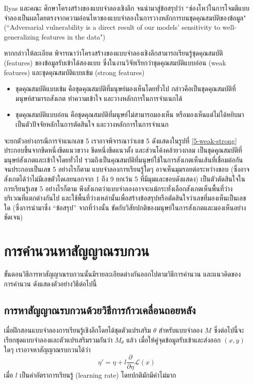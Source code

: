 \documentclass{cpereport}
\begin{document}
Ilyas และคณะ \cite{1905.02175} ศึกษาโครงสร้างของแบบจำลองเชิงลึก จนนำมาสู่ข้อสรุปว่า ``ช่องโหว่ในการโจมตีแบบจำลองเป็นผลโดยตรงจากความอ่อนไหวของแบบจำลองในการวางหลักการบนชุดคุณสมบัติของข้อมูล" (``Adversarial vulnerability is a direct result of our models’ sensitivity to well-generalizing features in the data")

หากกล่าวให้ละเอียด พิจารณาว่าโครงสร้างของแบบจำลองเชิงลึกสามารถเรียนรู้ชุดคุณสมบัติ (features) ของข้อมูลรับเข้าได้สองแบบ ซึ่งในงานวิจัยเรียกว่าชุดคุณสมบัติแบบอ่อน (weak features) และชุดคุณสมบัติแบบเข้ม (strong features)

\begin{itemize}
    \item ชุดคุณสมบัติแบบเข้ม คือชุดคุณสมบัติที่มนุษย์มองเห็นโดยทั่วไป กล่าวคือเป็นชุดคุณสมบัติที่มนุษย์สามารถสังเกต ทำความเข้าใจ และวางหลักการในการจำแนกได้
    \item ชุดคุณสมบัติแบบอ่อน คือชุดคุณสมบัติที่มนุษย์ไม่สามารถมองเห็น หรือมองเห็นแต่ไม่ได้หยิบมาเป็นตัวปัจจัยหลักในการตัดสินใจ และวางหลักการในการจำแนก
\end{itemize}

จะยกตัวอย่างกรณีการจำแนกเลข 5 เราอาจพิจารณาว่าเลข 5 ดังแสดงในรูปที่ \ref{5-weak-strong} ประกอบขึ้นจากขีดหนึ่งขีดแนวขวาง ขีดหนึ่งขีดแนวตั้ง และส่วนโค้งคล้ายวงกลม เป็นชุดคุุณสมบัติที่มนุษย์สังเกตและเข้าใจโดยทั่วไป รวมถึงเป็นคุณสมบัติที่มนุษย์ใช้ในการสังเกตเห็นเส้นที่เชื่อมต่อกันจนประกอบเป็นเลข 5 อย่างไรก็ตาม แบบจำลองการเรียนรู้ใดๆ อาจเห็นมุมรอยต่อระหว่างขอบ (ซึ่งอาจสังเกตได้ว่าไม่มีเลขตัวใดเลยนอกจาก 1 ถึง 9 ยกเว้น 5 ที่มีมุมและขอบดังแสดง) เป็นตัวตัดสินใจในการเรียนรู้เลข 5 อย่างไรก็ตาม พึงสังเกตว่าแบบจำลองอาจจะแม้กระทั่งเลือกสังเกตเห็นพื้นที่ว่างบริเวณที่แตกต่างกันไป และใช้พื้นที่ว่างเหล่านั้นเพื่อสร้างข้อสรุปหรือตัดสินใจว่าเลขที่มองเห็นเป็นเลขใด (ซึ่งการนำมาซึ่ง ``ข้อสรุป'' จากที่ว่างนั้น ขัดกับวิสัยปกติของมนุษย์ในการสังเกตและมองเห็นอย่างชัดเจน)

\section{การคำนวนหาสัญญาณรบกวน}

ขั้นตอนวิธีการหาสัญญาณรบกวนนั้นมีรายละเอียดต่างกันออกไปตามวิธีการคำนวน และแนวคิดของการคำนวน ดังแสดงตัวอย่างวิธีต่อไปนี้

\subsection{การหาสัญญาณรบกวนด้วยวิธีการก้าวเคลื่อนถอยหลัง}
เมื่อฝึกสอนแบบจำลองการเรียนรู้เชิงลึกโดยได้ชุดตัวแปรเสริม $\theta$ สำหรับแบบจำลอง $M$ ซึ่งต่อไปนี้จะเรียกชุดแบบจำลองและตัวแปรเสริมรวมกันว่า $M_\theta$ แล้ว เมื่อให้คู่จุดข้อมูลรับเข้าและส่งออก $(x, y)$ ใดๆ เราอาจหาสัญญาณรบกวนได้ว่า
\begin{equation}
    \eta' = \eta + l \frac{\partial}{\partial \eta} \mathscr{L}\left( x \right)
    \label{adver-gradient-descent}
\end{equation}
เมื่อ $l$ เป็นค่าอัตราการเรียนรู้ (learning rate) โดยปกติมักมีค่าไม่มาก
\end{document}
